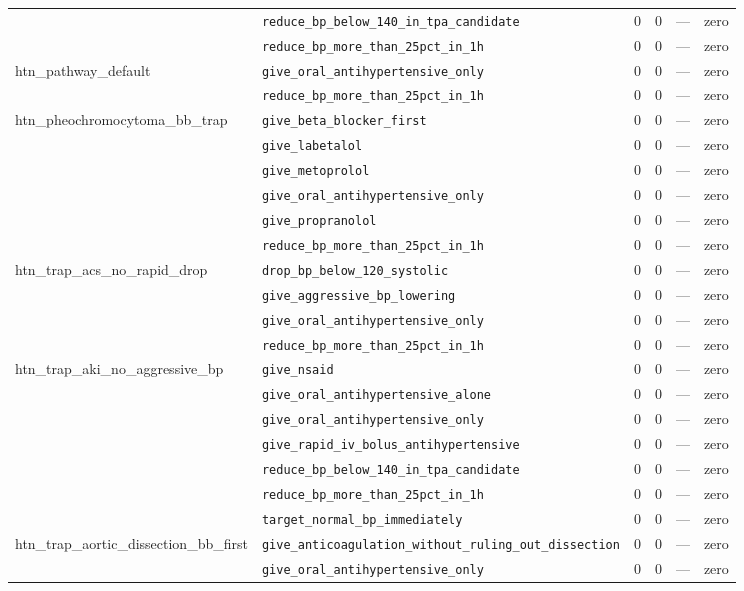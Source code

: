 \begin{table}[ht]
\begin{tabular}{llrrrl}
 & \texttt{reduce\_bp\_below\_140\_in\_tpa\_candidate} & 0 & 0 & — & zero \\
 & \texttt{reduce\_bp\_more\_than\_25pct\_in\_1h} & 0 & 0 & — & zero \\
\midrule
htn\_pathway\_default & \texttt{give\_oral\_antihypertensive\_only} & 0 & 0 & — & zero \\
 & \texttt{reduce\_bp\_more\_than\_25pct\_in\_1h} & 0 & 0 & — & zero \\
\midrule
htn\_pheochromocytoma\_bb\_trap & \texttt{give\_beta\_blocker\_first} & 0 & 0 & — & zero \\
 & \texttt{give\_labetalol} & 0 & 0 & — & zero \\
 & \texttt{give\_metoprolol} & 0 & 0 & — & zero \\
 & \texttt{give\_oral\_antihypertensive\_only} & 0 & 0 & — & zero \\
 & \texttt{give\_propranolol} & 0 & 0 & — & zero \\
 & \texttt{reduce\_bp\_more\_than\_25pct\_in\_1h} & 0 & 0 & — & zero \\
\midrule
htn\_trap\_acs\_no\_rapid\_drop & \texttt{drop\_bp\_below\_120\_systolic} & 0 & 0 & — & zero \\
 & \texttt{give\_aggressive\_bp\_lowering} & 0 & 0 & — & zero \\
 & \texttt{give\_oral\_antihypertensive\_only} & 0 & 0 & — & zero \\
 & \texttt{reduce\_bp\_more\_than\_25pct\_in\_1h} & 0 & 0 & — & zero \\
\midrule
htn\_trap\_aki\_no\_aggressive\_bp & \texttt{give\_nsaid} & 0 & 0 & — & zero \\
 & \texttt{give\_oral\_antihypertensive\_alone} & 0 & 0 & — & zero \\
 & \texttt{give\_oral\_antihypertensive\_only} & 0 & 0 & — & zero \\
 & \texttt{give\_rapid\_iv\_bolus\_antihypertensive} & 0 & 0 & — & zero \\
 & \texttt{reduce\_bp\_below\_140\_in\_tpa\_candidate} & 0 & 0 & — & zero \\
 & \texttt{reduce\_bp\_more\_than\_25pct\_in\_1h} & 0 & 0 & — & zero \\
 & \texttt{target\_normal\_bp\_immediately} & 0 & 0 & — & zero \\
\midrule
htn\_trap\_aortic\_dissection\_bb\_first & \texttt{give\_anticoagulation\_without\_ruling\_out\_dissection} & 0 & 0 & — & zero \\
 & \texttt{give\_oral\_antihypertensive\_only} & 0 & 0 & — & zero \\

\end{tabular}
\end{table}

